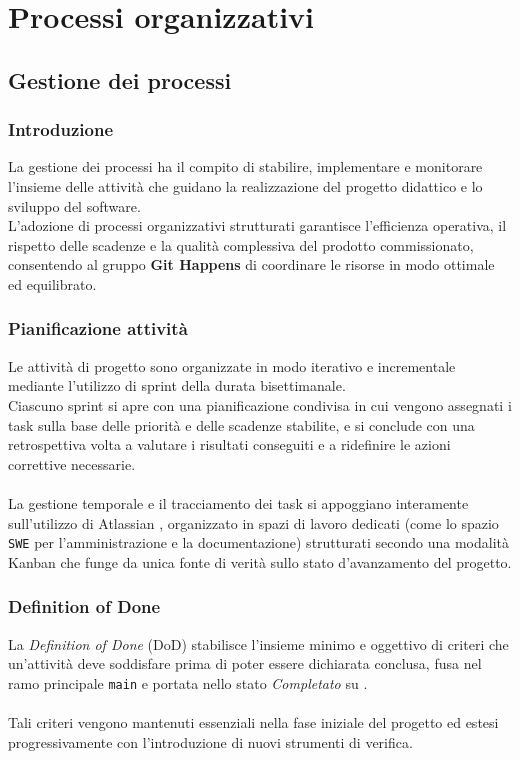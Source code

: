 \section{Processi organizzativi}

\subsection{Gestione dei processi}

\subsubsection{Introduzione}
La gestione dei processi ha il compito di stabilire, implementare e monitorare l'insieme delle attività che guidano la realizzazione del progetto didattico e lo sviluppo del software. \\
L'adozione di processi organizzativi strutturati garantisce l'efficienza operativa, il rispetto delle scadenze e la qualità complessiva del prodotto commissionato, consentendo al gruppo \textbf{Git Happens} di coordinare le risorse in modo ottimale ed equilibrato.

\subsubsection{Pianificazione attività}
Le attività di progetto sono organizzate in modo iterativo e incrementale mediante l'utilizzo di sprint della durata bisettimanale. \\
Ciascuno sprint si apre con una pianificazione condivisa in cui vengono assegnati i task sulla base delle priorità e delle scadenze stabilite, e si conclude con una retrospettiva volta a valutare i risultati conseguiti e a ridefinire le azioni correttive necessarie. \\
\\
La gestione temporale e il tracciamento dei task si appoggiano interamente sull'utilizzo di Atlassian , organizzato in spazi di lavoro dedicati (come lo spazio \texttt{SWE} per l'amministrazione e la documentazione) strutturati secondo una modalità Kanban che funge da unica fonte di verità sullo stato d'avanzamento del progetto.

\subsubsection{Definition of Done}
La \emph{Definition of Done} (DoD) stabilisce l'insieme minimo e oggettivo di criteri che un'attività deve soddisfare prima di poter essere dichiarata conclusa, fusa nel ramo principale \texttt{main} e portata nello stato \emph{Completato} su . \\
\\
Tali criteri vengono mantenuti essenziali nella fase iniziale del progetto ed estesi progressivamente con l'introduzione di nuovi strumenti di verifica.

